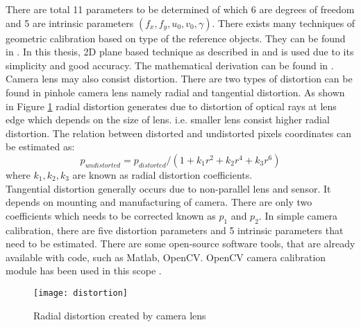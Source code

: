 There are total 11 parameters to be determined of which 6 are degrees of freedom and 5 are intrinsic parameters $ (f_{x},f_{y},u_{0},v_{0}, \gamma) $. There exists many techniques of geometric calibration based on type of the reference objects. They can be found in \cite{cameracalib}. In this thesis, 2D plane based technique as described in \cite{zhangcalib} and \cite{sturmcalib} is used due to its simplicity and good accuracy. The mathematical derivation can be found in \cite{cameracalib}.\\
\newline
Camera lens may also consist distortion. There are two types of distortion can be found in pinhole camera lens namely radial and tangential distortion. As shown in Figure \ref{fig:distortion} radial distortion generates due to distortion of optical rays at lens edge which depends on the size of lens. i.e. smaller lens consist higher radial distortion. The relation between distorted and undistorted pixels coordinates can be estimated as:
\begin{equation*}
p_{undistorted} = p_{distorted} /(1+ k_{1}r^{2}+k_{2}r^{4}+k_{3}r^{6})
\end{equation*} 
where $ k_{1},k_{2},k_{3} $ are known as radial distortion coefficients.\\
\newline
Tangential distortion generally occurs due to non-parallel lens and sensor. It depends on mounting and manufacturing of camera. There are only two coefficients which needs to be corrected known as $p_{1} $ and $ p_{2} $. In simple camera calibration, there are five distortion parameters and 5 intrinsic parameters that need to be estimated. There are some open-source software tools, that are already available with code, such as Matlab, OpenCV. OpenCV camera calibration module has been used in this scope \cite{opencvcalib}. 
\begin{figure}[h!]
	\centering
	\texttt{[image: distortion]}
	\caption{Radial distortion created by camera lens \cite{opencvcalib}}
	\label{fig:distortion}
\end{figure}

